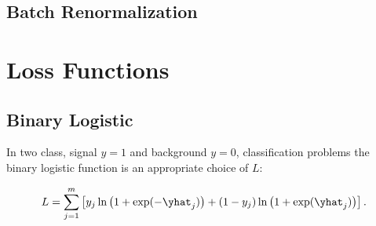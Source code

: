 \subsection{Batch Renormalization}
\label{ml_general:reg:batch_renorm}

\section{Loss Functions}
\label{ml_general:loss_func}


\subsection{Binary Logistic}
\label{ml_general:loss_func:binary_logistic}

In two class, signal $y=1$ and background $y=0$, classification problems the binary logistic function is an appropriate choice of $L$:

\begin{equation} \label{eq:binary_logistic}
L = \sum_{j=1}^{m} \left[y_{j} \ln\left(1 + \exp(-\yhat_{j})\right) +\left(1-y_{j}\right) \ln\left(1 + \exp(\yhat_{j})\right)\right].
\end{equation}


